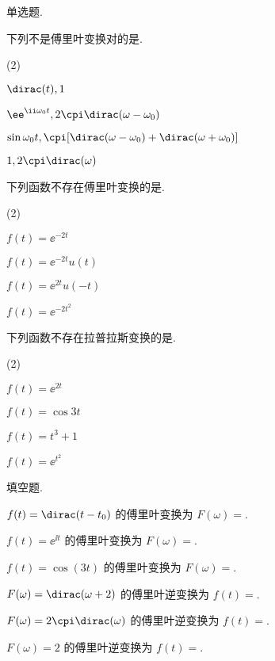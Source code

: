 \begin{homework}
  \item 单选题.
  \begin{homework}
    \item 下列不是傅里叶变换对的是\fillbrace{}.
    \begin{exchoice}(2)
      \item $\dirac(t),1$
      \item $\ee^{\ii \omega_0t},2\cpi\dirac(\omega-\omega_0)$
      \item $\sin \omega_0t, \cpi[\dirac(\omega-\omega_0)+\dirac(\omega+\omega_0)]$
      \item $1,2\cpi\dirac(\omega)$
    \end{exchoice}
    \item 下列函数不存在傅里叶变换的是\fillbrace{}.
    \begin{exchoice}(2)
      \item $f(t)=\ee^{-2t}$
      \item $f(t)=\ee^{-2t}u(t)$
      \item $f(t)=\ee^{2t}u(-t)$
      \item $f(t)=\ee^{-2t^2}$
    \end{exchoice}
    \item 下列函数不存在拉普拉斯变换的是\fillbrace{}.
    \begin{exchoice}(2)
      \item $f(t)=\ee^{2t}$
      \item $f(t)=\cos 3t$
      \item $f(t)=t^3+1$
      \item $f(t)=\ee^{t^2}$
    \end{exchoice}
  \end{homework}
  \item 填空题.
  \begin{homework}
    \item $f(t)=\dirac(t-t_0)$ 的傅里叶变换为 $F(\omega)=$\fillblank{}.
    \item $f(t)=\ee^{\ii t}$ 的傅里叶变换为 $F(\omega)=$\fillblank{}.
    \item $f(t)=\cos(3t)$ 的傅里叶变换为 $F(\omega)=$\fillblank{}.
    \item $F(\omega)=\dirac(\omega+2)$ 的傅里叶逆变换为 $f(t)=$\fillblank{}.
    \item $F(\omega)=2\cpi\dirac(\omega)$ 的傅里叶逆变换为 $f(t)=$\fillblank{}.
    \item $F(\omega)=2$ 的傅里叶逆变换为 $f(t)=$\fillblank{}.
  \end{homework}

\end{homework}
